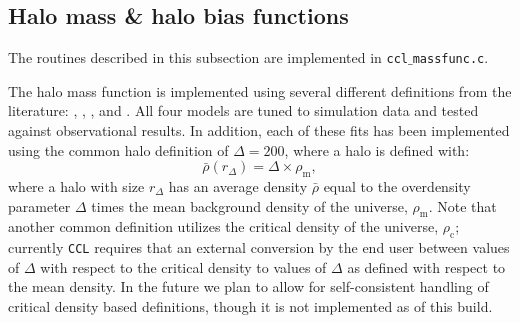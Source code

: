 \documentclass[\docopts]{\docclass}
\newcommand{\ccl}{{\tt CCL}\xspace}
\begin{document}

%
%


\subsection{Halo mass \& halo bias functions}
\label{sec:hmf}

The routines described in this subsection are implemented in {\tt ccl$\_$massfunc.c}.

The halo mass function is implemented using several different definitions from the literature: \citet{Tinker2008}, \citet{Tinker2010}, \citet{Angulo2012}, and \citet{Watson2013}. All four models are tuned to simulation data and tested against observational results. In addition, each of these fits has been implemented using the common halo definition of $\Delta = 200$, where a halo is defined with:
\begin{equation}
\bar{\rho}(r_{\Delta}) = \Delta \times \rho_{\mathrm{m}},
\end{equation}
where a halo with size $r_{\Delta}$ has an average density $\bar{\rho}$ equal to the overdensity parameter $\Delta$ times the mean background density of the universe, $\rho_{\mathrm{m}}$. Note that another common definition utilizes the critical density of the universe, $\rho_{\mathrm{c}}$; currently \ccl requires that an external conversion by the end user between values of $\Delta$ with respect to the critical density to values of $\Delta$ as defined with respect to the mean density. In the future we plan to allow for self-consistent handling of critical density based definitions, though it is not implemented as of this build.
\end{document}
